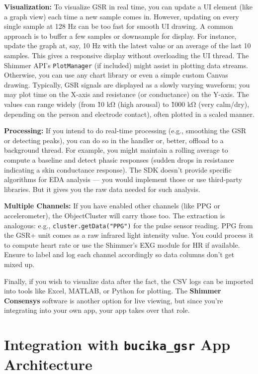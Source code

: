 \textbf{Visualization:} To visualize GSR in real time, you can update a UI
element (like a graph view) each time a new sample comes in. However,
updating on every single sample at 128 Hz can be too fast for smooth UI
drawing. A common approach is to buffer a few samples or downsample for
display. For instance, update the graph at, say, 10 Hz with the latest
value or an average of the last 10 samples. This gives a responsive
display without overloading the UI thread. The Shimmer API's
\texttt{PlotManager} (if included) might assist in plotting data
streams\cite{InstantStressSmartphone2019}.
Otherwise, you can use any chart library or even a simple custom Canvas
drawing. Typically, GSR signals are displayed as a slowly varying
waveform; you may plot time on the X-axis and resistance (or
conductance) on the Y-axis. The values can range widely (from \~10 kΩ
(high arousal) to \~1000 kΩ (very calm/dry), depending on the person and
electrode contact), often plotted in a scaled manner.

\textbf{Processing:} If you intend to do real-time processing (e.g.,
smoothing the GSR or detecting peaks), you can do so in the handler or,
better, offload to a background thread. For example, you might maintain
a rolling average to compute a baseline and detect phasic responses
(sudden drops in resistance indicating a skin conductance response). The
SDK doesn't provide specific algorithms for EDA analysis --- you would
implement those or use third-party libraries. But it gives you the raw
data needed for such analysis.

\textbf{Multiple Channels:} If you have enabled other channels (like PPG or
accelerometer), the ObjectCluster will carry those too. The extraction
is analogous: e.g., \texttt{cluster.getData("PPG")} for the pulse sensor
reading. PPG from the GSR+ unit comes as a raw infrared light intensity
value. You could process it to compute heart rate or use the Shimmer's
EXG module for HR if available. Ensure to label and log each channel
accordingly so data columns don't get mixed up.

Finally, if you wish to visualize data after the fact, the CSV logs can
be imported into tools like Excel, MATLAB, or Python for plotting. The
\textbf{Shimmer Consensys} software is another option for live viewing, but
since you're integrating into your own app, your app takes over that
role.

\section{Integration with \texttt{bucika_gsr} App Architecture}

